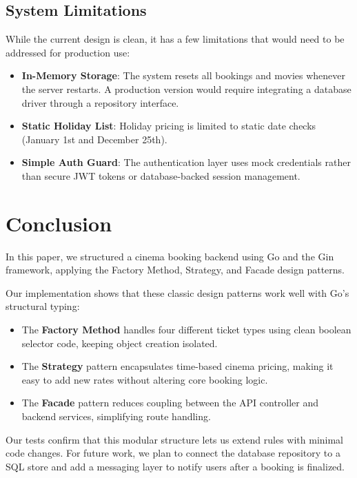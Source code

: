 \documentclass[conference]{IEEEtran}
\begin{document}
\subsection{System Limitations}

While the current design is clean, it has a few limitations that would need to be addressed for production use:
\begin{itemize}
  \item \textbf{In-Memory Storage}: The system resets all bookings and movies whenever the server restarts. A production version would require integrating a database driver through a repository interface.
  \item \textbf{Static Holiday List}: Holiday pricing is limited to static date checks (January 1st and December 25th).
  \item \textbf{Simple Auth Guard}: The authentication layer uses mock credentials rather than secure JWT tokens or database-backed session management.
\end{itemize}

\section{Conclusion}
\label{sec:conclusion}

In this paper, we structured a cinema booking backend using Go and the Gin framework, applying the Factory Method, Strategy, and Facade design patterns. 

Our implementation shows that these classic design patterns work well with Go's structural typing:
\begin{itemize}
  \item The \textbf{Factory Method} handles four different ticket types using clean boolean selector code, keeping object creation isolated.
  \item The \textbf{Strategy} pattern encapsulates time-based cinema pricing, making it easy to add new rates without altering core booking logic.
  \item The \textbf{Facade} pattern reduces coupling between the API controller and backend services, simplifying route handling.
\end{itemize}

Our tests confirm that this modular structure lets us extend rules with minimal code changes. For future work, we plan to connect the database repository to a SQL store and add a messaging layer to notify users after a booking is finalized.



\end{document}
